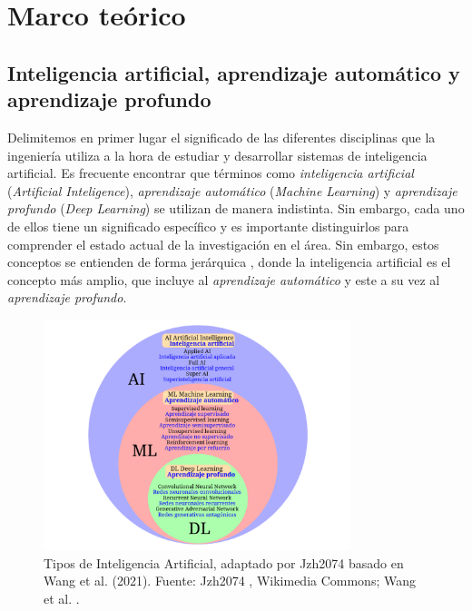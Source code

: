 \chapter{Marco teórico}

\section{Inteligencia artificial, aprendizaje automático y aprendizaje profundo}

Delimitemos en primer lugar el significado de las diferentes disciplinas que la ingeniería utiliza a la hora de estudiar y desarrollar sistemas de inteligencia artificial. Es frecuente encontrar que términos como \textit{inteligencia artificial} (\textit{Artificial Inteligence}), \textit{aprendizaje automático} (\textit{Machine Learning}) y \textit{aprendizaje profundo} (\textit{Deep Learning}) se utilizan de manera indistinta. Sin embargo, cada uno de ellos tiene un significado específico y es importante distinguirlos para comprender el estado actual de la investigación en el área. Sin embargo, estos conceptos se entienden de forma jerárquica \cite{}, donde la inteligencia artificial es el concepto más amplio, que incluye al \textit{aprendizaje automático} y este a su vez al \textit{aprendizaje profundo}.

\begin{figure}[H]
    \centering
    \includegraphics[width=0.8\textwidth]{./figuras/Tipos_Inteligencia_Artificial.png}
    \caption[Tipos de Inteligencia Artificial]{Tipos de Inteligencia Artificial, adaptado por Jzh2074 basado en Wang et al. (2021). Fuente: Jzh2074 \protect\citeyear{jzh2074}, Wikimedia Commons; Wang et al. \protect\citeyear{wang2021promising}.}
    \label{fig:ai_types}
\end{figure}


